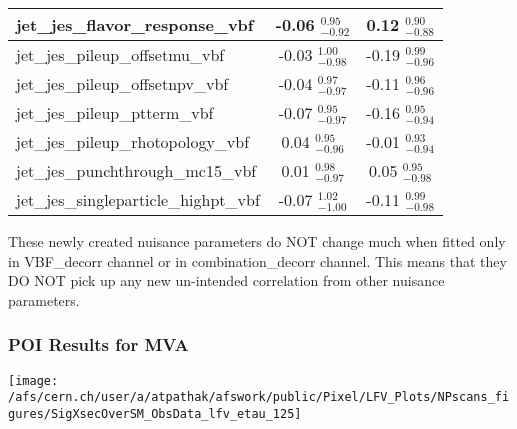 \documentclass{beamer}
\begin{document}
\begin{frame}
\begin{table}
{{\begin{tabular}{| l |c | c |}
jet\_jes\_flavor\_response\_vbf               &-0.06 \boldmath${^{ 0.95}_{-0.92}}$ &0.12 \boldmath${^{ 0.90}_{-0.88}}$ \\\hline
jet\_jes\_pileup\_offsetmu\_vbf               &-0.03 \boldmath${^{ 1.00}_{-0.98}}$ &-0.19 \boldmath${^{ 0.99}_{-0.96}}$ \\\hline
jet\_jes\_pileup\_offsetnpv\_vbf              &-0.04 \boldmath${^{ 0.97}_{-0.97}}$ & -0.11 \boldmath${^{ 0.96}_{-0.96}}$ \\\hline
jet\_jes\_pileup\_ptterm\_vbf                 & -0.07 \boldmath${^{ 0.95}_{-0.97}}$ &-0.16 \boldmath${^{ 0.95}_{-0.94}}$\\\hline
jet\_jes\_pileup\_rhotopology\_vbf            &0.04 \boldmath${^{ 0.95}_{-0.96}}$&-0.01 \boldmath${^{ 0.93}_{-0.94}}$ \\\hline
jet\_jes\_punchthrough\_mc15\_vbf             &0.01 \boldmath${^{ 0.98}_{-0.97}}$ &0.05 \boldmath${^{ 0.95}_{-0.98}}$ \\\hline
jet\_jes\_singleparticle\_highpt\_vbf         &-0.07 \boldmath${^{ 1.02}_{-1.00}}$ & -0.11 \boldmath${^{ 0.99}_{-0.98}}$\\\hline

\end{tabular}
}}
\end{table}

These newly created nuisance parameters do NOT change much when fitted only in VBF\_decorr channel or in combination\_decorr channel.
This means that they DO NOT pick up any new un-intended correlation from other nuisance parameters.

\end{frame}
\begin{frame}
\frametitle{POI Results for MVA}
\begin{normalsize}

  \begin{center}
    \texttt{[image: /afs/cern.ch/user/a/atpathak/afswork/public/Pixel/LFV\_Plots/NPscans\_figures/SigXsecOverSM\_ObsData\_lfv\_etau\_125]}
   \end{center}

  \vspace*{-0.5cm}
  \begin{table}
{}
\end{table}
\end{normalsize}
\end{frame}
\end{document}
